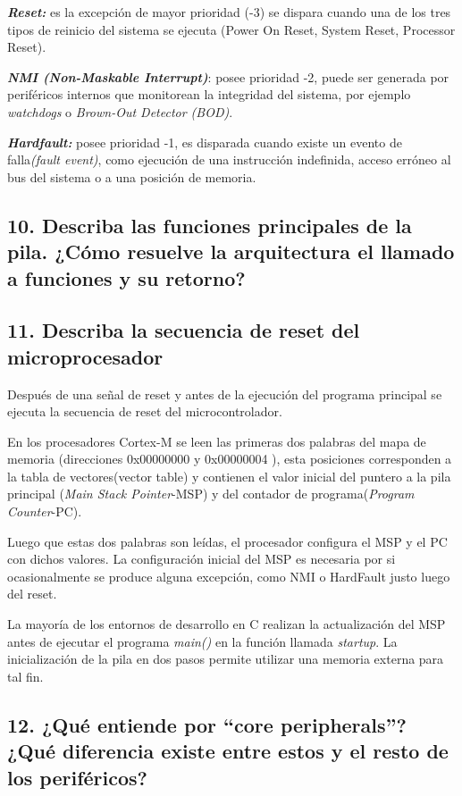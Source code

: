 \documentclass[10pt,a4paper,twoside,spanish]{article}	%
\begin{document}
  \textbf{\textit{Reset:}} es la excepción de mayor prioridad (-3) se dispara cuando una de los tres tipos de reinicio del sistema se ejecuta (Power On Reset, System Reset, Processor Reset). 
  
  \textbf{\textit{NMI (Non-Maskable Interrupt)}}: posee prioridad -2,  puede ser generada por periféricos internos que monitorean la integridad del sistema, por ejemplo \textit{watchdogs} o \textit{Brown-Out Detector (BOD)}.
  
  \textbf{\textit{Hardfault:}} posee prioridad -1, es disparada cuando existe un evento de falla\textit{(fault event)}, como ejecución de una instrucción indefinida, acceso erróneo al bus del sistema o a una posición de memoria. 

\subsection*{10. Describa las funciones principales de la pila. ¿Cómo resuelve la arquitectura el llamado a funciones y su retorno?}

\subsection*{11. Describa la secuencia de reset del microprocesador}

Después de una señal de reset y antes de la ejecución del programa principal se ejecuta la secuencia de reset del microcontrolador.
 
En los procesadores Cortex-M se leen las primeras dos palabras del mapa de memoria (direcciones 0x00000000 y 0x00000004 ), esta posiciones corresponden a la tabla de vectores(vector table) y contienen el valor inicial del puntero a la pila principal (\textit{Main Stack Pointer}-MSP) y del contador de programa(\textit{Program Counter}-PC).

Luego que estas dos palabras son leídas, el procesador configura el MSP y el PC con dichos valores. La configuración inicial del MSP es necesaria por si ocasionalmente se produce alguna excepción, como NMI o HardFault justo luego del reset.

La mayoría de los entornos de desarrollo en C realizan la actualización del MSP antes de ejecutar el programa \textit{main()} en la función llamada \textit{startup}. La inicialización de la pila en dos pasos permite utilizar una memoria externa para tal fin. 



\subsection*{12. ¿Qué entiende por “core peripherals”? ¿Qué diferencia existe entre estos y el resto de los periféricos?}
\end{document}
